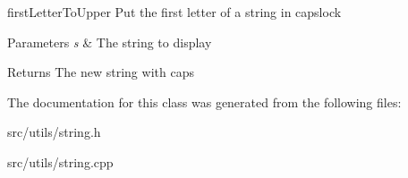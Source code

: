 first\+Letter\+To\+Upper Put the first letter of a string in capslock 


\begin{DoxyParams}{Parameters}
{\em s} & The string to display \\
\hline
\end{DoxyParams}
\begin{DoxyReturn}{Returns}
The new string with caps 
\end{DoxyReturn}


The documentation for this class was generated from the following files\+:\begin{DoxyCompactItemize}
\item 
src/utils/string.\+h\item 
src/utils/string.\+cpp\end{DoxyCompactItemize}
